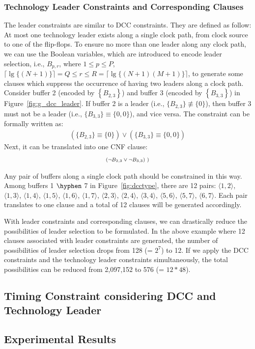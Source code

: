 \subsubsection{Technology Leader Constraints and Corresponding Clauses}
\label{sec:TVA:dcc_c}
The leader constraints are similar to DCC constraints. They are defined as follow: At most one technology leader exists along a single clock path, from clock source to one of the flip-flops. To ensure no more than one leader along any clock path, we can use the Boolean variables, which are introduced to encode leader selection, i.e., $B_{p,r}$, where $1 \leq p \leq P$, $\lceil \lg \{(N + 1)\} \rceil = Q \leq r \leq R = \lceil \lg \{(N + 1)(M + 1)\} \rceil$, to generate some clauses which suppress the occurrence of having two leaders along a clock path. Consider buffer 2 (encoded by $\left\{B_{2,3}\right\}$) and buffer 3 (encoded by $\left\{B_{3,3}\right\}$) in Figure~\ref{fig:g_dcc_leader}. If buffer 2 is a leader (i.e., $\{B_{2,3}\} \not\equiv \{0\}$), then buffer 3 must not be a leader (i.e., $\{B_{3,3}\} \equiv \{0, 0\}$), and vice versa. The constraint can be formally written as:
\begin{gather*}
\left(\{B_{2,3}\} \equiv \{0\}\right) \lor \left(\{B_{3,3}\} \equiv \{0, 0\}\right)
\end{gather*}
Next, it can be translated into one CNF clause:
\begin{gather*}
\mbox{\fontsize{7}{8.4}\selectfont ($\neg B_{2,3}\lor\neg B_{3,3}$) )} 
\end{gather*}

Any pair of buffers along a single clock path should be constrained in this way. Among buffers 1 $\hyphen$ 7 in Figure~\ref{fig:dcctype}, there are 12 pairs: $\langle1, 2\rangle$, $\langle1, 3\rangle$, $\langle1, 4\rangle$, $\langle1, 5\rangle$, $\langle1, 6\rangle$, $\langle1, 7\rangle$, $\langle2, 3\rangle$, $\langle2, 4\rangle$, $\langle3, 4\rangle$, $\langle5, 6\rangle$, $\langle5, 7\rangle$, $\langle6, 7\rangle$. Each pair translates to one clause and a total of 12 clauses will be generated accordingly.

With leader constraints and corresponding clauses, we can drastically reduce the possibilities of leader selection to be formulated. In the above example where 12 clauses associated with leader constraints are generated, the number of possibilities of leader selection drops from 128 (= $2^7$) to 12. If we apply the DCC constraints and the technology leader constraints simultaneously, the total possibilities can be reduced from 2,097,152 to 576 (= $12*48$).

\subsection{Timing Constraint considering DCC and Technology Leader}
\label{sec:TVA:timingconstraint}

\subsection{Experimental Results}
\label{sec:TVA:experiment}